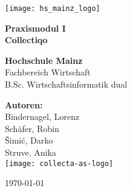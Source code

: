 \begin{titlepage}
    \centering
    \vspace*{1cm}

    \texttt{[image: hs\_mainz\_logo]}\\
    \vspace{1.5cm}

    \textbf{\LARGE Praxismodul I}\\
    \vspace{0.5cm}
    \textbf{\Large Collectiqo}\\
    \vspace{1.5cm}

    \textbf{Hochschule Mainz}\\
    \vspace{0.5cm}
    Fachbereich Wirtschaft\\
    \vspace{0.5cm}
    B.Sc. Wirtschaftsinformatik dual\\
    \vspace{1.5cm}

    \textbf{Autoren:}\\
    Bindernagel, Lorenz\\
    Schäfer, Robin\\
    Šimić, Darko\\
    Struve, Anika\\

    \texttt{[image: collecta-as-logo]}\\
    \vfill

    \today
\end{titlepage}
